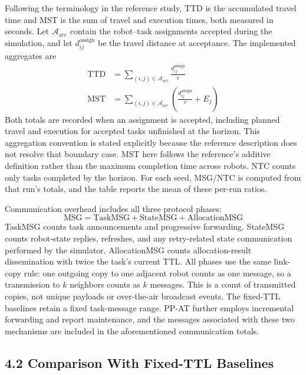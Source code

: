 \documentclass[type=submission,name=IR]{oae}
\begin{document}
Following the terminology in the reference study, TTD is the accumulated travel time and MST is the sum of travel and execution times, both measured in seconds. Let $\mathcal{A}_{\mathrm{acc}}$ contain the robot--task assignments accepted during the simulation, and let $d_{ij}^{\mathrm{assign}}$ be the travel distance at acceptance. The implemented aggregates are
\begin{equation}
\begin{aligned}
\mathrm{TTD}&=\sum_{(i,j)\in\mathcal{A}_{\mathrm{acc}}}
\frac{d_{ij}^{\mathrm{assign}}}{v}\\
\mathrm{MST}&=\sum_{(i,j)\in\mathcal{A}_{\mathrm{acc}}}
\left(\frac{d_{ij}^{\mathrm{assign}}}{v}+E_j\right)
\end{aligned}
\label{eq:time_metrics}
\end{equation}
Both totals are recorded when an assignment is accepted, including planned travel and execution for accepted tasks unfinished at the horizon. This aggregation convention is stated explicitly because the reference description does not resolve that boundary case. MST here follows the reference's additive definition rather than the maximum completion time across robots. NTC counts only tasks completed by the horizon. For each seed, MSG/NTC is computed from that run's totals, and the table reports the mean of these per-run ratios.

Communication overhead includes all three protocol phases:
\begin{equation}
\mathrm{MSG}=\mathrm{TaskMSG}+\mathrm{StateMSG}+\mathrm{AllocationMSG}
\label{eq:message_metrics}
\end{equation}
TaskMSG counts task announcements and progressive forwarding. StateMSG counts robot-state replies, refreshes, and any retry-related state communication performed by the simulator. AllocationMSG counts allocation-result dissemination with twice the task's current TTL. All phases use the same link-copy rule: one outgoing copy to one adjacent robot counts as one message, so a transmission to $k$ neighbors counts as $k$ messages. This is a count of transmitted copies, not unique payloads or over-the-air broadcast events. The fixed-TTL baselines retain a fixed task-message range. PP-AT further employs incremental forwarding and report maintenance, and the messages associated with these two mechanisms are included in the aforementioned communication totals.

\subsection{4.2 Comparison With Fixed-TTL Baselines}
\end{document}
